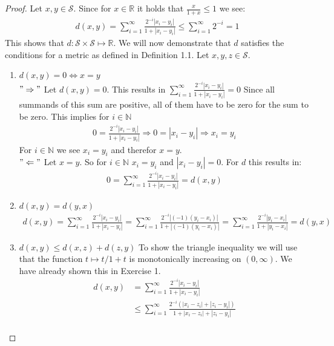 \documentclass[a4paper]{article}
\newcommand{\R}{\mathbb{R}} %
\newcommand{\N}{\mathbb{N}} %
\begin{document}
\begin{proof}
Let $x,y \in \mathcal{S}$.
Since for $x \in \R$ it holds that $\frac{x}{1+x} \leq 1$ we see:
\begin{align*}
    d(x,y) = \sum_{i = 1}^{\infty} \frac{2^{-i} |x_i - y_i|}{1+ |x_i - y_i|} \leq \sum_{i = 1}^{\infty} 2^{-i} = 1 
\end{align*}
This shows that $d: \mathcal{S} \times \mathcal{S} \mapsto \R $.
We will now demonstrate that $d$ satisfies the conditions for a metric as defined in Definition 1.1. Let $x,y,z \in \mathcal{S}$. 
\begin{enumerate}
        \item $d(x,y) = 0 \Leftrightarrow x = y$\\
        $"\Rightarrow"$ Let $d(x,y) = 0$. This results in $ \sum_{i = 1}^{\infty} \frac{2^{-i} |x_i - y_i|}{1+ |x_i - y_i|} = 0 $ 
        Since all summands of this sum are positive, all of them have to be zero for the sum to be zero. This implies for $i \in \N$
        \begin{align*}
            0 = \frac{2^{-i} |x_i - y_i|}{1+ |x_i - y_i|}
            \Rightarrow 0= |x_i - y_i| \Rightarrow x_i = y_i
        \end{align*}
        For $i \in \N$ we see  $x_i = y_i $ and therefor $x = y$.\\
        $"\Leftarrow"$ Let $x = y $. So for $i \in \N$ $x_i = y_i$ and $|x_i -y_i| = 0 $. For $d$ this results in: 
        \begin{align*}
            0 = \sum_{i = 1}^{\infty} \frac{2^{-i} |x_i - y_i|}{1+ |x_i - y_i|} = d(x,y)
        \end{align*}
        \item $d(x,y) = d(y,x)$
        \begin{align*}
            d(x,y) = \sum_{i = 1}^{\infty} \frac{2^{-i} |x_i - y_i|}{1+ |x_i - y_i|} = \sum_{i = 1}^{\infty} \frac{2^{-i} |(-1)(y_i - x_i)|}{1+ |(-1)(y_i - x_i)|} = \sum_{i = 1}^{\infty} \frac{2^{-i} |y_i - x_i|}{1+ |y_i - x_i|} = d(y,x)
        \end{align*}
        \item $d(x,y) \leq d(x,z) + d(z,y)$
        To show the triangle inequality we will use that the function $t \mapsto t/1+ t$ is monotonically increasing on $(0,\infty)$. We have already shown this in Exercise 1. 
        \begin{align*}
            d(x,y) & = \sum_{i = 1}^{\infty} \frac{2^{-i} |x_i - y_i|}{1+ |x_i - y_i|} \\
            & \leq \sum_{i = 1}^{\infty} \frac{2^{-i} (|x_i - z_i| + |z_i - y_i|)}{1+ |x_i - z_i| + |z_i - y_i|}\\

\end{align*}
\end{enumerate}
\end{proof}
\end{document}
